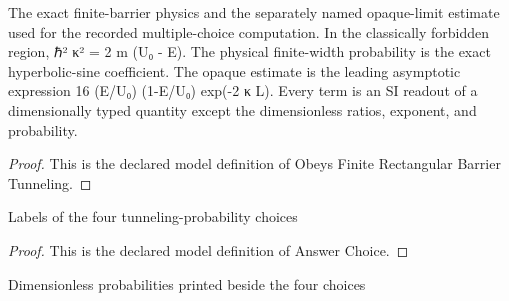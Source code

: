 \begin{definition}
  \label{def:physics:phyx-mini-0520:phyxminiproblems-problemphyxmini0520-obeysfiniterectangularbarriertunneling}
  The exact finite-barrier physics and the separately named opaque-limit estimate used for the recorded multiple-choice computation. In the classically forbidden region, ℏ² κ² = 2 m (U₀ - E). The physical finite-width probability is the exact hyperbolic-sine coefficient. The opaque estimate is the leading asymptotic expression 16 (E/U₀) (1-E/U₀) exp(-2 κ L). Every term is an SI readout of a dimensionally typed quantity except the dimensionless ratios, exponent, and probability.
\end{definition}
\begin{proof}
  This is the declared model definition of Obeys Finite Rectangular Barrier Tunneling.
\end{proof}
\begin{definition}
  \label{def:physics:phyx-mini-0520:phyxminiproblems-problemphyxmini0520-answerchoice}
  Labels of the four tunneling-probability choices
\end{definition}
\begin{proof}
  This is the declared model definition of Answer Choice.
\end{proof}
\begin{definition}
  \label{def:physics:phyx-mini-0520:phyxminiproblems-problemphyxmini0520-displayedtunnelingprobability}
  Dimensionless probabilities printed beside the four choices
\end{definition}
